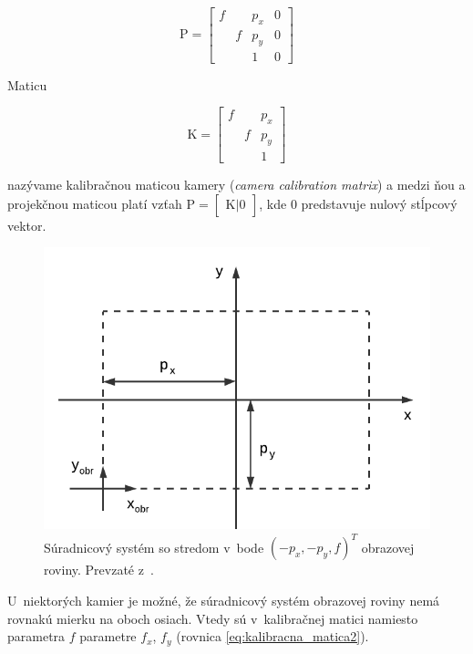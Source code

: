 \begin{equation}
\mathrm{P} =
\begin{bmatrix}
f &   & p_x & 0 \\
  & f & p_y & 0 \\
  &   &  1  & 0
\end{bmatrix}
\label{eq:projekcna_matica3}
\end{equation}

Maticu

\begin{equation}
\mathrm{K} 
=
\begin{bmatrix}
f &   &  p_x \\
  & f &  p_y \\
  &   &   1  
\end{bmatrix}
\label{eq:kalibracna_matica1}
\end{equation}

nazývame kalibračnou maticou kamery (\emph{camera calibration matrix}) a medzi ňou a projekčnou maticou platí vzťah
$\mathrm{P} = \begin{bmatrix} \mathrm{K} | 0 \end{bmatrix}$, kde $0$ predstavuje nulový stĺpcový vektor.

\begin{figure}[h!]
    \centering
    \includegraphics[width=0.7\linewidth]{text_prace/obrazky-figures/model_kamery3.pdf}
    \caption[Súradnicový systém so stredom v~bode $(-p_x, -p_y, f)^T$ obrazovej roviny.]{Súradnicový systém so stredom v~bode $(-p_x, -p_y, f)^T$ obrazovej roviny. Prevzaté z~\cite{multiple_view_geometry}.}
    \label{fig:model_kamery3}
\end{figure}

U~niektorých kamier je možné, že súradnicový systém obrazovej roviny nemá rovnakú mierku na oboch osiach. Vtedy sú v~kalibračnej matici namiesto parametra $f$ parametre $f_x$, $f_y$ (rovnica \ref{eq:kalibracna_matica2}).

